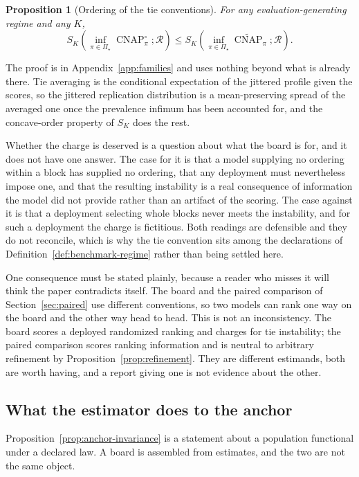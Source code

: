 \documentclass[11pt]{article}
\newcommand{\CNAP}{\operatorname{CNAP}}
\newcommand{\Regime}{\mathcal{R}}
\newcommand{\PSet}{\Pi_\star}
\newcommand{\CNAPta}{\widetilde{\CNAP}}
\newcommand{\CNAPj}{\CNAP^{\circ}}
\newtheorem{proposition}{Proposition}
\theoremstyle{remark}
\begin{document}
\begin{proposition}[Ordering of the tie conventions]
\label{prop:convention-order}
For any evaluation-generating regime and any $K$,
\[
S_K
\left(
\inf_{\pi\in\PSet}\CNAPj_\pi;\Regime
\right)
\leq
S_K
\left(
\inf_{\pi\in\PSet}\CNAPta_\pi;\Regime
\right).
\]
\end{proposition}

The proof is in Appendix~\ref{app:families} and uses nothing beyond what is already there. Tie averaging is the conditional expectation of the jittered profile given the scores, so the jittered replication distribution is a mean-preserving spread of the averaged one once the prevalence infimum has been accounted for, and the concave-order property of $S_K$ does the rest.

Whether the charge is deserved is a question about what the board is for, and it does not have one answer. The case for it is that a model supplying no ordering within a block has supplied no ordering, that any deployment must nevertheless impose one, and that the resulting instability is a real consequence of information the model did not provide rather than an artifact of the scoring. The case against it is that a deployment selecting whole blocks never meets the instability, and for such a deployment the charge is fictitious. Both readings are defensible and they do not reconcile, which is why the tie convention sits among the declarations of Definition~\ref{def:benchmark-regime} rather than being settled here.

One consequence must be stated plainly, because a reader who misses it will think the paper contradicts itself. The board and the paired comparison of Section~\ref{sec:paired} use different conventions, so two models can rank one way on the board and the other way head to head. This is not an inconsistency. The board scores a deployed randomized ranking and charges for tie instability; the paired comparison scores ranking information and is neutral to arbitrary refinement by Proposition~\ref{prop:refinement}. They are different estimands, both are worth having, and a report giving one is not evidence about the other.

\subsection{What the estimator does to the anchor}
\label{sec:anchor-estimation}

Proposition~\ref{prop:anchor-invariance} is a statement about a population functional under a declared law. A board is assembled from estimates, and the two are not the same object.
\end{document}
